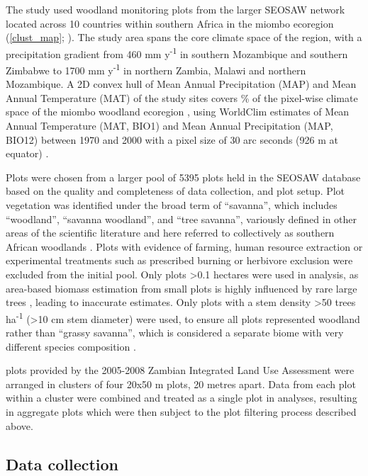 \documentclass[11pt,a4paper]{article}
\newcommand{\textapprox}{\raisebox{0.5ex}{\texttildelow}}  %
\begin{document}
The study used \nplots{} woodland monitoring plots from the larger SEOSAW network \citep{seosaw_web} located across 10 countries within southern Africa in the miombo ecoregion (\autoref{clust_map}; \citealt{White1987}). The study area spans the core climate space of the region, with a precipitation gradient from \textapprox{}460 mm y\textsuperscript{-1} in southern Mozambique and southern Zimbabwe to \textapprox{}1700 mm y\textsuperscript{-1} in northern Zambia, Malawi and northern Mozambique. A 2D convex hull of Mean Annual Precipitation (MAP) and Mean Annual Temperature (MAT) of the study sites covers \hullcover{}\% of the pixel-wise climate space of the miombo woodland ecoregion \citep{White1987}, using WorldClim estimates of Mean Annual Temperature (MAT, BIO1) and Mean Annual Precipitation (MAP, BIO12) between 1970 and 2000 with a pixel size of 30 arc seconds (926 m at equator) \citep{Fick2017}. 

Plots were chosen from a larger pool of 5395 plots held in the SEOSAW database \citep{seosaw_web} based on the quality and completeness of data collection, and plot setup. Plot vegetation was identified under the broad term of ``savanna'', which includes ``woodland'', ``savanna woodland'', and ``tree savanna'', variously defined in other areas of the scientific literature and here referred to collectively as southern African woodlands \citep{Ratnam2011, Hill2010}. Plots with evidence of farming, human resource extraction or experimental treatments such as prescribed burning or herbivore exclusion were excluded from the initial pool. Only plots >0.1 hectares were used in analysis, as area-based biomass estimation from small plots is highly influenced by rare large trees \citep{Stegen2011}, leading to inaccurate estimates. Only plots with a stem density >50 trees ha\textsuperscript{-1} (>10 cm stem diameter) were used, to ensure all plots represented woodland rather than ``grassy savanna'', which is considered a separate biome with very different species composition \citep{Parr2014}. 

\nzam{} plots provided by the 2005-2008 Zambian Integrated Land Use Assessment \citep{Mukosha2009, Pelletier2018} were arranged in clusters of four 20x50 m plots, 20 metres apart. Data from each plot within a cluster were combined and treated as a single plot in analyses, resulting in \nzamcluster{} aggregate plots which were then subject to the plot filtering process described above.

\subsection{Data collection}
 
\end{document}
